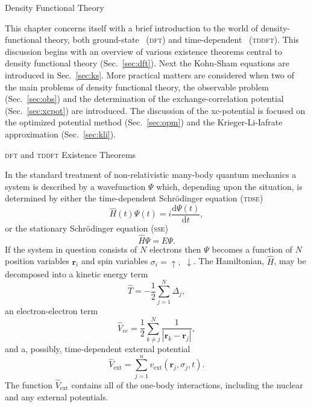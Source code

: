 \documentclass[letterpaper, 11 pt]{report}
\begin{document}
\begin{chapter}{Density Functional Theory \label{chap:dft}}

   This chapter concerns itself with a brief introduction to the world of density-functional theory,
   both ground-state~\cite{dft-engel} (\textsc{dft}) and time-dependent~\cite{tddft, ullrich, marques-1}
   (\textsc{tddft}). This discussion begins with an overview  of various existence theorems central to
   density functional theory (Sec.~\ref{sec:dft}). Next the Kohn-Sham equations are introduced in
   Sec.~\ref{sec:ks}. More practical matters are considered when two of the main problems of density
   functional theory, the observable problem (Sec.~\ref{sec:obs}) and the determination of the
   exchange-correlation potential (Sec.~\ref{sec:xcpot}) are introduced. The discussion of the
   xc-potential is focused on the optimized potential method (Sec.~\ref{sec:opm}) and the
   Krieger-Li-Iafrate approximation (Sec.~\ref{sec:kli}).

   \begin{section}{\textsc{dft} and \textsc{tddft} Existence Theorems \label{sec:dft}}

      In the standard treatment of non-relativistic many-body quantum mechanics a system is described by
      a wavefunction $\Psi$ which, depending upon the situation, is determined by either the
      time-dependent Schr\"{o}dinger equation (\textsc{tdse})
      \begin{equation} \label{eq:tdse}
         \hat{H}(t) \Psi(t) = i \frac{\mathrm{d} \Psi(t)}{\mathrm{d} t},
      \end{equation}
      or the stationary Schr\"{o}dinger equation (\textsc{sse})
      \begin{equation} \label{eq:sse}
         \hat{H} \Psi = E \Psi.
      \end{equation}
      If the system in question consists of $N$ electrons then $\Psi$ becomes a function of $N$ position
      variables $\mathbf{r}_i$ and spin variables $\sigma_i = \uparrow,$ $\downarrow$. The Hamiltonian,
      $\hat{H}$, may be decomposed into a kinetic energy term
      \begin{equation} \label{eq:Top}
         \hat{T} = -\frac{1}{2} \sum\limits^{N}_{j=1} \Delta_j,
      \end{equation}
      an electron-electron term
      \begin{equation} \label{eq:Vee}
         \hat{V}_{ee} = \frac{1}{2} \sum\limits^{N}_{k \neq j}
                        \frac{1}{\left| \mathbf{r}_k - \mathbf{r}_j \right|},
      \end{equation}
      and a, possibly, time-dependent external potential
      \begin{equation} \label{eq:Vext}
         \hat{V}_\mathrm{ext} = \sum\limits^{n}_{j = 1} v_\mathrm{ext} (\mathbf{r}_j, \sigma_j, t).
      \end{equation}
      The function $\hat{V}_\mathrm{ext}$ contains all of the one-body interactions, including the
      nuclear and any external potentials.


\end{section}
\end{chapter}
\end{document}
